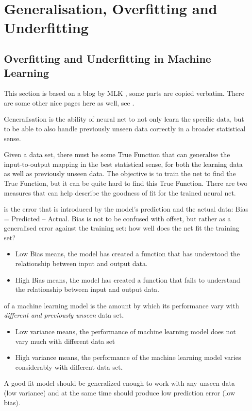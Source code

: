 
\chapter{Generalisation, Overfitting and Underfitting}
\label{sec:GeneralisationOverfittingandUnderfitting}

\section{Overfitting and Underfitting in Machine Learning}

This section is based on a blog by MLK \cite{MLK2019}, some parts are copied verbatim. There are some other nice pages here as well, see \cite{MLK2018}.

Generalisation is the ability of  neural net to not only learn the specific data, but to be able to also handle previously unseen data correctly in a broader statistical sense. 

Given a data set, there must be some True Function that can generalise the input-to-output mapping in the best statistical sense, for both the learning data as well as previously unseen data.  The objective is to train the net to find the True Function, but it can be quite hard to find this True Function.
There are two measures that can help describe the goodness of fit for the trained neural net.

 is the error that is introduced by the model's prediction and the actual data: Bias = Predicted – Actual.  Bias is not to be confused with offset, but rather as a generalised error against the training set: how well does the net fit the training set?
\begin{itemize}
\item Low Bias means, the model has created a function that has understood the relationship between input and output data.
\item  High Bias means, the model has created a function that fails to understand the relationship between input and output data.
\end{itemize}

 of a machine learning model is the amount by which its performance vary with \textit{different and previously unseen} data set.
\begin{itemize}
\item  Low variance means, the performance of machine learning model does not vary much with different data set
\item  High variance means, the performance of the machine learning model varies considerably with different data set.
\end{itemize}
A good fit model should be generalized enough to work with any unseen data (low variance) and at the same time should produce low prediction error (low bias).

